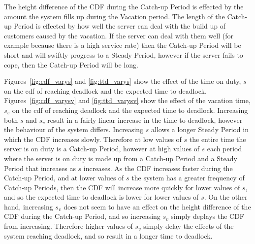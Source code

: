 \documentclass{article}
\begin{document}
The height difference of the CDF during the Catch-up Period is effected by the amount the system fills up during the Vacation period. The length of the Catch-up Period is effected by how well the server can deal with the build up of customers caused by the vacation. If the server can deal with them well (for example because there is a high service rate) then the Catch-up Period will be short and will swiftly progress to a Steady Period, however if the server fails to cope, then the Catch-up Period will be long.

Figures~\ref{fig:cdf_varys} and \ref{fig:ttd_varys} show the effect of the time on duty, $s$ on the cdf of reaching deadlock and the expected time to deadlock. Figures~\ref{fig:cdf_varysv} and \ref{fig:ttd_varysv} show the effect of the vacation time, $s_v$ on the cdf of reaching deadlock and the expected time to deadlock. Increasing both $s$ and $s_v$ result in a fairly linear increase in the time to deadlock, however the behaviour of the system differs. Increasing $s$ allows a longer Steady Period in which the CDF increases slowly. Therefore at low values of $s$ the entire time the server is on duty is a Catch-up Period, however at high values of $s$ each period where the server is on duty is made up from a Catch-up Period and a Steady Period that increases as $s$ increases. As the CDF increases faster during the Catch-up Period, and at lower values of $s$ the system has a greater frequency of Catch-up Periods, then the CDF will increase more quickly for lower values of $s$, and so the expected time to deadlock is lower for lower values of $s$. On the other hand, increasing $s_v$ does not seem to have an effect on the height difference of the CDF during the Catch-up Period, and so increasing $s_v$ simply deplays the CDF from increasing. Therefore higher values of $s_v$ simply delay the effects of the system reaching deadlock, and so result in a longer time to deadlock.
\end{document}
